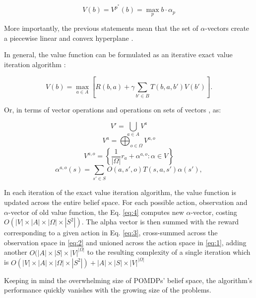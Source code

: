 \begin{equation} V(b) = V^{p}^{*}(b) = \operatorname*{max}_p b \cdot \alpha_p \end{equation}

More importantly, the previous statements mean that the set of $\alpha$-vectors create a piecewise linear and convex hyperplane \cite{russel2010}.

In general, the value function can be formulated as an iterative exact value iteration algorithm \cite{Shani2013}:

\begin{equation} V(b) = \max_{a \in A} [R(b, a) + \gamma \sum_{b' \in B} T(b, a, b') V(b')].\end{equation}

Or, in terms of vector operations and operations on sets of vectors \cite{Shani2013}, as:

\begin{equation} \label{eq:1} V' = \bigcup_{a \in A} V^a \end{equation}
\begin{equation} \label{eq:2} V^a = \bigoplus_{o \in \Omega} V^{a,o} \end{equation}
\begin{equation} \label{eq:3} V^{a,o} = \left\{\dfrac{1}{|\Omega|} r_a + \alpha^{a, o} : \alpha \in V \right\} \end{equation} 
\begin{equation} \label{eq:4} \alpha^{a, o}(s) = \sum_{s' \in S} O(a, s', o) T(s, a, s') \alpha(s'),\end{equation}

In each iteration of the exact value iteration algorithm, the value function is updated across the entire belief space. For each possible action, observation and $\alpha$-vector of old value function, the Eq. \ref{eq:4} computes new $\alpha$-vector, costing $O(|V| \times |A| \times |\Omega| \times |S^2|)$. The alpha vector is then summed with the reward corresponding to a given action in Eq. \ref{eq:3}, cross-summed across the observation space in \ref{eq:2} and unioned across the action space in \ref{eq:1}, adding another $O(|A| \times |S| \times |V|^{|\Omega|}$ to the resulting complexity of a single iteration which is $O(|V| \times |A| \times |\Omega| \times |S^2|) + |A| \times |S| \times |V|^{|\Omega|}$ 

 Keeping in mind the overwhelming size of POMDPs' belief space, the algorithm's performance quickly vanishes with the growing size of the problems.


